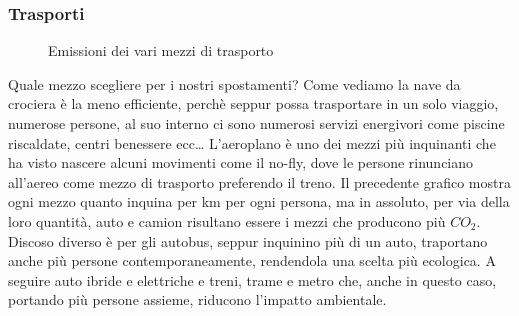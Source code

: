\documentclass[12pt]{book} %
\begin{document}
\subsubsection{Trasporti}
\begin{figure}[H]
    \centering
{}
\caption[Emissioni dei vari mezzi di trasporto]{
    Emissioni dei vari mezzi di trasporto
  }
\end{figure}

Quale mezzo scegliere per i nostri spostamenti? Come vediamo la nave da crociera è la meno efficiente, perchè seppur possa trasportare in un solo viaggio, numerose persone, al suo interno ci sono numerosi servizi energivori come piscine riscaldate, centri benessere ecc… L'aeroplano è uno dei mezzi più inquinanti che ha visto nascere alcuni movimenti come il no-fly, dove le persone rinunciano all'aereo come mezzo di trasporto preferendo il treno. Il precedente grafico mostra ogni mezzo quanto inquina per km per ogni persona, ma in assoluto, per via della loro quantità, auto e camion risultano essere i mezzi che producono più $CO_2$. Discoso diverso è per gli autobus, seppur inquinino più di un auto, traportano anche più persone contemporaneamente, rendendola una scelta più ecologica. A seguire auto ibride e elettriche e treni, trame e metro che, anche in questo caso, portando più persone assieme, riducono l'impatto ambientale.
\end{document}
